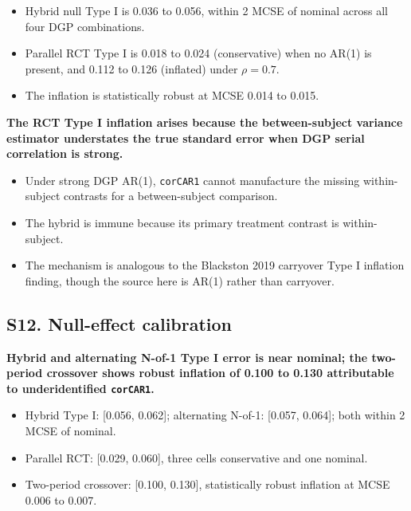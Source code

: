 \documentclass[
  11pt,
]{article}
\begin{document}
\begin{itemize}\setlength{\itemsep}{2pt}\setlength{\parskip}{0pt}
\item Hybrid null Type I is 0.036 to 0.056, within 2 MCSE of nominal across all four DGP combinations.
\item Parallel RCT Type I is 0.018 to 0.024 (conservative) when no AR(1) is present, and 0.112 to 0.126 (inflated) under $\rho = 0.7$.
\item The inflation is statistically robust at MCSE 0.014 to 0.015.
\end{itemize}

\textbf{The RCT Type I inflation arises because the between-subject variance estimator understates the true standard error when DGP serial correlation is strong.}

\begin{itemize}\setlength{\itemsep}{2pt}\setlength{\parskip}{0pt}
\item Under strong DGP AR(1), \texttt{corCAR1} cannot manufacture the missing within-subject contrasts for a between-subject comparison.
\item The hybrid is immune because its primary treatment contrast is within-subject.
\item The mechanism is analogous to the Blackston 2019 carryover Type I inflation finding, though the source here is AR(1) rather than carryover.
\end{itemize}

\subsection{S12. Null-effect calibration}\label{s12.-null-effect-calibration}

\textbf{Hybrid and alternating N-of-1 Type I error is near nominal; the two-period crossover shows robust inflation of 0.100 to 0.130 attributable to underidentified \texttt{corCAR1}.}

\begin{itemize}\setlength{\itemsep}{2pt}\setlength{\parskip}{0pt}
\item Hybrid Type I: [0.056, 0.062]; alternating N-of-1: [0.057, 0.064]; both within 2 MCSE of nominal.
\item Parallel RCT: [0.029, 0.060], three cells conservative and one nominal.
\item Two-period crossover: [0.100, 0.130], statistically robust inflation at MCSE 0.006 to 0.007.
\end{itemize}
\end{document}

